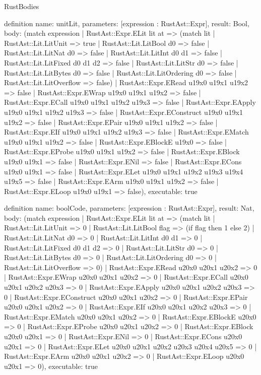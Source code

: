 \begin{lexlean}{RustBodies}
\begin{semanticmodule}
definition{
  name: unitLit,
  parameters: [expression : RustAst::Expr],
  result: Bool,
  body: (match expression
    | RustAst::Expr.ELit lit at => (match lit
      | RustAst::Lit.LitUnit => true
      | RustAst::Lit.LitBool d0 => false
      | RustAst::Lit.LitNat d0 => false
      | RustAst::Lit.LitInt d0 d1 => false
      | RustAst::Lit.LitFixed d0 d1 d2 => false
      | RustAst::Lit.LitStr d0 => false
      | RustAst::Lit.LitBytes d0 => false
      | RustAst::Lit.LitOrdering d0 => false
      | RustAst::Lit.LitOverflow => false)
    | RustAst::Expr.ERead u19x0 u19x1 u19x2 => false
    | RustAst::Expr.EWrap u19x0 u19x1 u19x2 => false
    | RustAst::Expr.ECall u19x0 u19x1 u19x2 u19x3 => false
    | RustAst::Expr.EApply u19x0 u19x1 u19x2 u19x3 => false
    | RustAst::Expr.EConstruct u19x0 u19x1 u19x2 => false
    | RustAst::Expr.EPair u19x0 u19x1 u19x2 => false
    | RustAst::Expr.EIf u19x0 u19x1 u19x2 u19x3 => false
    | RustAst::Expr.EMatch u19x0 u19x1 u19x2 => false
    | RustAst::Expr.EBlockE u19x0 => false
    | RustAst::Expr.EProbe u19x0 u19x1 u19x2 => false
    | RustAst::Expr.EBlock u19x0 u19x1 => false
    | RustAst::Expr.ENil => false
    | RustAst::Expr.ECons u19x0 u19x1 => false
    | RustAst::Expr.ELet u19x0 u19x1 u19x2 u19x3 u19x4 u19x5 => false
    | RustAst::Expr.EArm u19x0 u19x1 u19x2 => false
    | RustAst::Expr.ELoop u19x0 u19x1 => false),
  executable: true
}

definition{
  name: boolCode,
  parameters: [expression : RustAst::Expr],
  result: Nat,
  body: (match expression
    | RustAst::Expr.ELit lit at => (match lit
      | RustAst::Lit.LitUnit => 0
      | RustAst::Lit.LitBool flag => (if flag then 1 else 2)
      | RustAst::Lit.LitNat d0 => 0
      | RustAst::Lit.LitInt d0 d1 => 0
      | RustAst::Lit.LitFixed d0 d1 d2 => 0
      | RustAst::Lit.LitStr d0 => 0
      | RustAst::Lit.LitBytes d0 => 0
      | RustAst::Lit.LitOrdering d0 => 0
      | RustAst::Lit.LitOverflow => 0)
    | RustAst::Expr.ERead u20x0 u20x1 u20x2 => 0
    | RustAst::Expr.EWrap u20x0 u20x1 u20x2 => 0
    | RustAst::Expr.ECall u20x0 u20x1 u20x2 u20x3 => 0
    | RustAst::Expr.EApply u20x0 u20x1 u20x2 u20x3 => 0
    | RustAst::Expr.EConstruct u20x0 u20x1 u20x2 => 0
    | RustAst::Expr.EPair u20x0 u20x1 u20x2 => 0
    | RustAst::Expr.EIf u20x0 u20x1 u20x2 u20x3 => 0
    | RustAst::Expr.EMatch u20x0 u20x1 u20x2 => 0
    | RustAst::Expr.EBlockE u20x0 => 0
    | RustAst::Expr.EProbe u20x0 u20x1 u20x2 => 0
    | RustAst::Expr.EBlock u20x0 u20x1 => 0
    | RustAst::Expr.ENil => 0
    | RustAst::Expr.ECons u20x0 u20x1 => 0
    | RustAst::Expr.ELet u20x0 u20x1 u20x2 u20x3 u20x4 u20x5 => 0
    | RustAst::Expr.EArm u20x0 u20x1 u20x2 => 0
    | RustAst::Expr.ELoop u20x0 u20x1 => 0),
  executable: true
}


\end{semanticmodule}
\end{lexlean}
